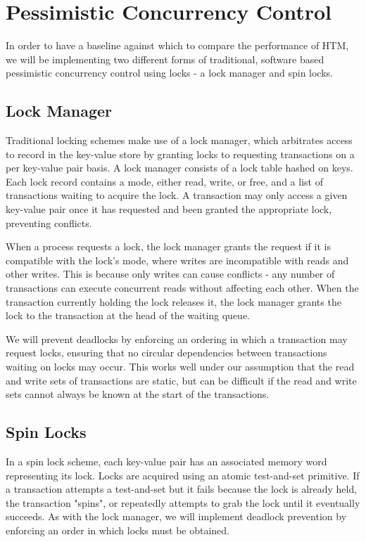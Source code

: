 \section{Pessimistic Concurrency Control} \label{sec:pessimistic}

In order to have a baseline against which to compare the performance of HTM, we will be implementing two different forms of traditional, software based pessimistic concurrency control using locks - a lock manager and spin locks.

\subsection{Lock Manager}

Traditional locking schemes make use of a lock manager, which arbitrates access to record in the key-value store by granting locks to requesting transactions on a per key-value pair basis. A lock manager consists of a lock table hashed on keys. Each lock record contains a mode, either read, write, or free, and a list of transactions waiting to acquire the lock. A transaction may only access a given key-value pair once it has requested and been granted the appropriate lock, preventing conflicts.

When a process requests a lock, the lock manager grants the request if it is compatible with the lock's mode, where writes are incompatible with reads and other writes. This is because only writes can cause conflicts - any number of transactions can execute concurrent reads without affecting each other. When the transaction currently holding the lock releases it, the lock manager grants the lock to the transaction at the head of the waiting queue.

We will prevent deadlocks by enforcing an ordering in which a transaction may request locks, ensuring that no circular dependencies between transactions waiting on locks may occur. This works well under our assumption that the read and write sets of transactions are static, but can be difficult if the read and write sets cannot always be known at the start of the transactions.\\

\subsection{Spin Locks}

In a spin lock scheme, each key-value pair has an associated memory word representing its lock. Locks are acquired using an atomic test-and-set primitive. If a transaction attempts a test-and-set but it fails because the lock is already held, the transaction "spins", or repeatedly attempts to grab the lock until it eventually succeeds. As with the lock manager, we will implement deadlock prevention by enforcing an order in which locks must be obtained.

